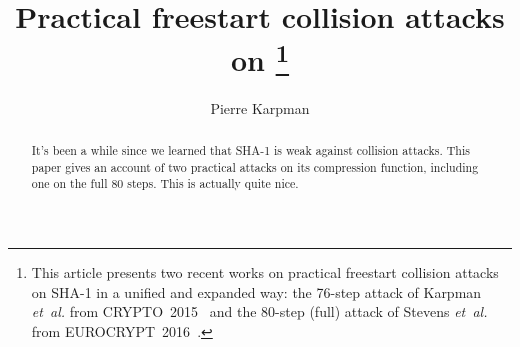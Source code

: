 \documentclass[11pt]{article}
\newcommand{\shaone}               {SHA-1\xspace}
\newcommand{\etal}{\mbox{\emph{et al.}}\xspace}
\begin{document}
\renewcommand{\sectionautorefname}{Section}
\renewcommand{\subsectionautorefname}{Section}
\renewcommand{\subsubsectionautorefname}{Section}
\newcommand{\appendixref}[1]{\hyperref[#1]{Appendix~\ref*{#1}}}

\makeatletter
\renewcommand*{\@fnsymbol}[1]{\ensuremath{\ifcase#1\or \text{\decosix} \or \text{\leafNE} \or \text{\aldine} \or \text{\floweroneleft} \or \text{\textxswdown}
\or \ddagger \or \ddagger\ddagger \else\@ctrerr\fi}}
\makeatother


\title{
Practical freestart collision attacks on \thanks{This article presents two recent works on practical freestart collision attacks on \shaone in a unified and expanded way:
the 76-step attack of Karpman \etal from CRYPTO~2015~\cite{DBLP:conf/crypto/KarpmanPS15,76stepFull} and the 80-step (full) attack of Stevens \etal from
EUROCRYPT~2016~\cite{DBLP:conf/eurocrypt/StevensKP16,80stepFull}.}
}

\author{Pierre Karpman}%

\maketitle

\begin{abstract}
It's been a while since we learned that SHA-1 is weak against collision attacks. This paper gives an account of two practical attacks on its compression
function, including one on the full 80 steps. This is actually quite nice.
\end{abstract}

\setcounter{footnote}{0}


\tableofcontents
















\end{document}

